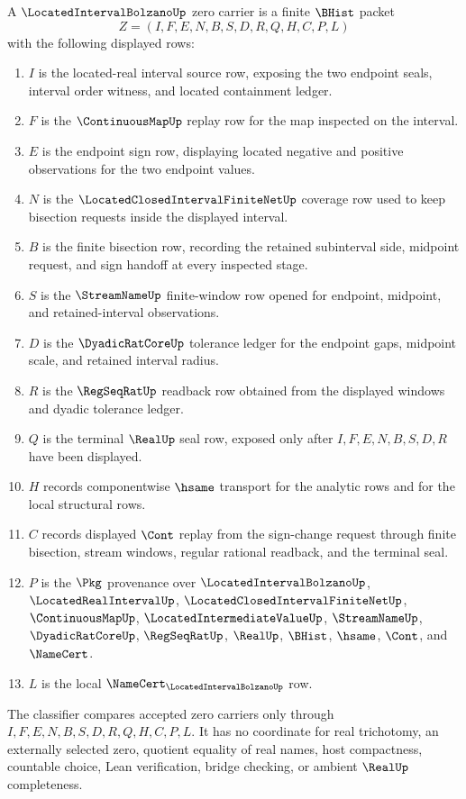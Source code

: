 \begin{definition}
\label{def:located-interval-bolzano-zero-carrier}
A $\LocatedIntervalBolzanoUp$ zero carrier is a finite $\BHist$ packet
$$
Z=(I,F,E,N,B,S,D,R,Q,H,C,P,L)
$$
with the following displayed rows:
\begin{enumerate}
\item $I$ is the located-real interval source row, exposing the two endpoint seals, interval order witness, and located containment ledger.
\item $F$ is the $\ContinuousMapUp$ replay row for the map inspected on the interval.
\item $E$ is the endpoint sign row, displaying located negative and positive observations for the two endpoint values.
\item $N$ is the $\LocatedClosedIntervalFiniteNetUp$ coverage row used to keep bisection requests inside the displayed interval.
\item $B$ is the finite bisection row, recording the retained subinterval side, midpoint request, and sign handoff at every inspected stage.
\item $S$ is the $\StreamNameUp$ finite-window row opened for endpoint, midpoint, and retained-interval observations.
\item $D$ is the $\DyadicRatCoreUp$ tolerance ledger for the endpoint gaps, midpoint scale, and retained interval radius.
\item $R$ is the $\RegSeqRatUp$ readback row obtained from the displayed windows and dyadic tolerance ledger.
\item $Q$ is the terminal $\RealUp$ seal row, exposed only after $I,F,E,N,B,S,D,R$ have been displayed.
\item $H$ records componentwise $\hsame$ transport for the analytic rows and for the local structural rows.
\item $C$ records displayed $\Cont$ replay from the sign-change request through finite bisection, stream windows, regular rational readback, and the terminal seal.
\item $P$ is the $\Pkg$ provenance over $\LocatedIntervalBolzanoUp$, $\LocatedRealIntervalUp$, $\LocatedClosedIntervalFiniteNetUp$, $\ContinuousMapUp$, $\LocatedIntermediateValueUp$, $\StreamNameUp$, $\DyadicRatCoreUp$, $\RegSeqRatUp$, $\RealUp$, $\BHist$, $\hsame$, $\Cont$, and $\NameCert$.
\item $L$ is the local $\NameCert_{\LocatedIntervalBolzanoUp}$ row.
\end{enumerate}
The classifier compares accepted zero carriers only through $I,F,E,N,B,S,D,R,Q,H,C,P,L$. It has no coordinate for real trichotomy, an externally selected zero, quotient equality of real names, host compactness, countable choice, Lean verification, bridge checking, or ambient $\RealUp$ completeness.
\end{definition}

